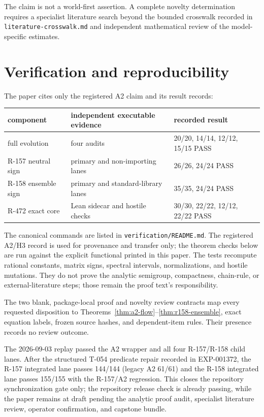 \documentclass[11pt]{article}
\numberwithin{equation}{section}
\theoremstyle{definition}
\begin{document}
The claim is not a world-first assertion.  A complete novelty determination
requires a specialist literature search beyond the bounded crosswalk recorded
in \texttt{literature-crosswalk.md} and independent mathematical review of the
model-specific estimates.

\section{Verification and reproducibility}
\label{sec:verification}

The paper cites only the registered A2 claim and its result records:
\begin{center}
\small
\begin{tabular}{lll}
\toprule
component & independent executable evidence & recorded result\\
\midrule
full evolution & four audits & 20/20, 14/14, 12/12, 15/15 PASS\\
R-157 neutral sign & primary and non-importing lanes & 26/26, 24/24 PASS\\
R-158 ensemble sign & primary and standard-library lanes & 35/35, 24/24 PASS\\
R-472 exact core & Lean sidecar and hostile checks & 30/30, 22/22, 12/12, 22/22 PASS\\
\bottomrule
\end{tabular}
\end{center}

The canonical commands are listed in \texttt{verification/README.md}.  The
registered A2/H3 record is used for provenance and transfer only; the theorem
checks below are run against the explicit functional printed in this paper.
The tests recompute rational constants, matrix signs, spectral intervals,
normalizations, and hostile mutations.  They do not prove the analytic
semigroup, compactness, chain-rule, or external-literature steps; those remain
the proof text's responsibility.

The two blank, package-local proof and novelty review contracts map every
requested disposition to
Theorems~\ref{thm:a2-flow}--\ref{thm:r158-ensemble}, exact equation labels,
frozen source hashes, and dependent-item rules.  Their presence records no
review outcome.

The 2026-09-03 replay passed the A2 wrapper and all four R-157/R-158 child
lanes.  After the structured T-054 predicate repair recorded in EXP-001372,
the R-157 integrated lane passes 144/144 (legacy A2 61/61) and the R-158
integrated lane passes 155/155 with the R-157/A2 regression.  This closes the
repository synchronization gate only; the repository release check is already
passing, while the paper remains at draft pending the analytic proof audit,
specialist literature review, operator confirmation, and capstone bundle.
\end{document}
